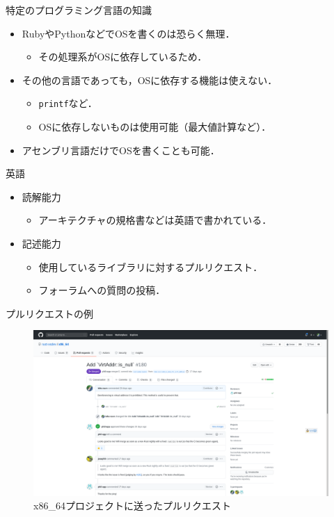 \documentclass[titlepage,dvipdfmx,uplatex,a4j,12pt]{beamer}
\begin{document}
\begin{frame}{特定のプログラミング言語の知識}
    \begin{itemize}
        \item RubyやPythonなどでOSを書くのは恐らく無理．
            \begin{itemize}
                \item その処理系がOSに依存しているため．
            \end{itemize}
        \item その他の言語であっても，OSに依存する機能は使えない．
            \begin{itemize}
                \item \lstinline{printf}など．
                \item OSに依存しないものは使用可能（最大値計算など）．
            \end{itemize}
        \item アセンブリ言語だけでOSを書くことも可能．
    \end{itemize}
\end{frame}

\begin{frame}{英語}
    \begin{itemize}
        \item 読解能力
            \begin{itemize}
                \item アーキテクチャの規格書などは英語で書かれている．
            \end{itemize}
        \item 記述能力
            \begin{itemize}
                \item 使用しているライブラリに対するプルリクエスト．
                \item フォーラムへの質問の投稿．
            \end{itemize}
    \end{itemize}
\end{frame}

\begin{frame}{プルリクエストの例}
    \begin{figure}[htbp]
        \centering
        \includegraphics[width=\linewidth]{pr_screen.png}
        \caption{x86\_64プロジェクトに送ったプルリクエスト}
        \label{fig:pr_screen.png}
    \end{figure}
\end{frame}
\end{document}
